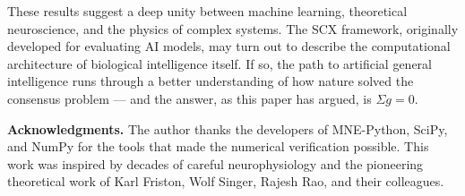 \documentclass[12pt,a4paper]{article}
\theoremstyle{remark}
\newcommand{\SCX}{\textsf{SCX}}
\begin{document}
These results suggest a deep unity between machine learning, theoretical
neuroscience, and the physics of complex systems. The \SCX{} framework,
originally developed for evaluating AI models, may turn out to describe the
computational architecture of biological intelligence itself. If so, the path
to artificial general intelligence runs through a better understanding of how
nature solved the consensus problem --- and the answer, as this paper has
argued, is $\Sigma g = 0$.

\vspace{1em}
\noindent
\textbf{Acknowledgments.} The author thanks the developers of MNE-Python,
SciPy, and NumPy for the tools that made the numerical verification possible.
This work was inspired by decades of careful neurophysiology and the
pioneering theoretical work of Karl Friston, Wolf Singer, Rajesh Rao,
and their colleagues.
\end{document}
